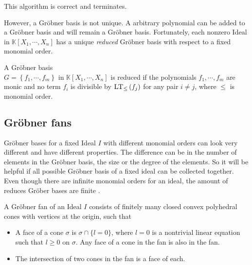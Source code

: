This algorithm is correct and terminates.\cite{KHZ}

\newpage

However, a Gröbner basis is not unique. A arbitrary polynomial can be added to a Gröbner basis and will remain a Gröbner basis.
Fortunately, each nonzero Ideal in $\mathbb{K}\left[X_{1}, \cdots, X_{n}\right]$ has a unique \textit{reduced} Gröbner basis with respect to a fixed monomial order.

\begin{env_definition}
\cite{KHZ}
A Gröbner basis \\ $G= \left\lbrace  f_{1}, \cdots , f_{m} \right\rbrace  $ in 
$ \mathbb{K}\left[X_{1}, \cdots, X_{n}\right] $ is reduced if the polynomials $f_{1},\cdots , f_{m} $ are monic and no term $f_{i}$ is divisible by $ \textsc{LT}_{\leq }\left( f_{j}\right)$ for any pair $i\neq j$, where $\leq$ is monomial order.
\end{env_definition}


\subsection{Gröbner fans}
\label{subsec:Groebnerfan}
 Gröbner bases for a fixed Ideal $I$ with different monomial orders can look very different and have different properties. The difference can be in the number of elements in the Gröbner basis, the size or the degree of the elements. So it will be helpful if all 
possible Gröbner basis of a fixed ideal can be collected together.\\
Even though there are infinite monomial orders for an ideal, the amount of reduces Gröber bases are finite \cite{coxOshea}. 
 
\begin{env_definition}
\cite{coxOshea} A Gröbner fan of an Ideal $I$ consists of finitely many closed convex polyhedral cones with vertices at the origin, such that

\begin{itemize}
\item
A face of a cone $\sigma$ is $\sigma \cap \lbrace l=0\rbrace$, where $l=0$ is a nontrivial linear equation such that $l \geq 0$ on $\sigma$.
Any face of a cone in the fan is also in the fan.
\item
The intersection of two cones in the fan is a face of each.
\end{itemize}

\end{env_definition}

